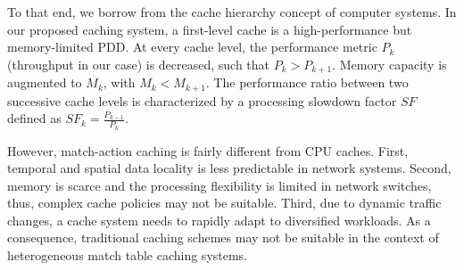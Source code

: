 

To that end, we borrow from the cache hierarchy concept of computer systems.
In our proposed caching system, a first-level cache is a high-performance but memory-limited PDD.
At every cache level, the performance metric $P_{k}$ (throughput in our case) is decreased, such that $P_{k} > P_{k+1}$.
Memory capacity is augmented to $M_{k}$, with $M_{k} < M_{k+1}$. 
The performance ratio between two successive cache levels is characterized by a processing slowdown factor $SF$ defined as $SF_{k} = \frac{P_{k-1}}{P_{k}}$.


However, match-action caching is fairly different from CPU caches.
First, temporal and spatial data locality is less predictable in network systems.
Second, memory is scarce and the processing flexibility is limited in network switches, thus, complex cache policies may not be suitable.
Third, due to dynamic traffic changes, a cache system needs to rapidly adapt to diversified workloads.
As a consequence, traditional caching schemes may not be suitable in the context of heterogeneous match table caching systems. 


